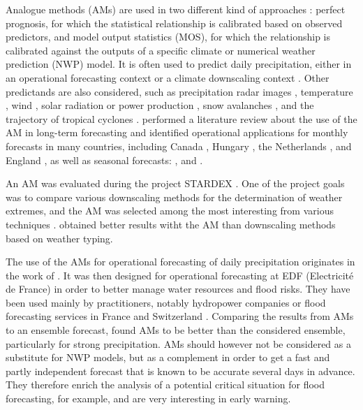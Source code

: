 \documentclass[review]{elsarticle}
\begin{document}
Analogue methods (AMs) are used in two different kind of approaches \citep{Rummukainen1997}: perfect prognosis, for which the statistical relationship is calibrated based on observed predictors, and model output statistics (MOS), for which the relationship is calibrated against the outputs of a specific climate or numerical weather prediction (NWP) model. It is often used to predict daily precipitation, either in an operational forecasting context \citep[e.g.][]{Guilbaud1997, Bontron2005, Hamill2006, Bliefernicht2010, Marty2012, Horton2012, Hamill2015, BenDaoud2016} or a climate downscaling context \citep[e.g.][]{Zorita1999, Wetterhall2005, Wetterhall2007, Matulla2007, Radanovics2013, Chardon2014, Dayon2015, Raynaud2016b}. Other predictands are also considered, such as precipitation radar images \citep{Panziera2011,Foresti2015a}, temperature \citep{Radinovic1975, Woodcock1980, Kruizinga1983, DelleMonache2013, Caillouet2016, Raynaud2016b}, wind \citep{Gordon1987, DelleMonache2013, DelleMonache2011, Vanvyve2015, Alessandrini2015, Junk2015, Junk2015c}, solar radiation or power production \citep{Alessandrini2015a, Bessa2015, Raynaud2016b}, snow avalanches \citep{Obled1980, Bolognesi1993}, and the trajectory of tropical cyclones \citep{Keenan1981, Sievers2000, Fraedrich2003}. \citet{Guilbaud1997} performed a literature review about the use of the AM in long-term forecasting and identified operational applications for monthly forecasts in many countries, including Canada \citep{Shabbar1986},  Hungary \citep{Toth1989}, the Netherlands \citep{Nap1981}, and England \citep{Murray1974}, as well as seasonal forecasts: \citet{Barnett1978}, \citet{Bergen1982} and \citet{Livezey1988}.

An AM was evaluated during the project STARDEX \citep[\textit{STAtistical and Regional dynamical Downscaling of EXtremes for European regions}, see][]{Goodess2003, Stardex2005}. One of the project goals was to compare various downscaling methods for the determination of weather extremes, and the AM was selected among the most interesting from various techniques \citep{Maheras2005, Schmidli2007}. \citet{Bliefernicht2010} obtained better results witht the AM than downscaling methods based on weather typing.

The use of the AMs for operational forecasting of daily precipitation originates in the work of \citet{Duband1970, Duband1974, Duband1981}. It was then designed for operational forecasting at EDF (Electricit\'{e} de France) in order to better manage water resources and flood risks. They have been used mainly by practitioners, notably hydropower companies \citep{Desaint2008a,BenDaoud2009,Obled2014} or flood forecasting services in France and Switzerland \citep{Marty2010,GarciaHernandez2009b,Horton2012}. Comparing the results from AMs to an ensemble forecast, \citet{Marty2010} found AMs to be better than the considered ensemble, particularly for strong precipitation. AMs should however not be considered as a substitute for NWP models, but as a complement in order to get a fast and partly independent forecast that is known to be accurate several days in advance. They therefore enrich the analysis of a potential critical situation for flood forecasting, for example, and are very interesting in early warning.
\end{document}

